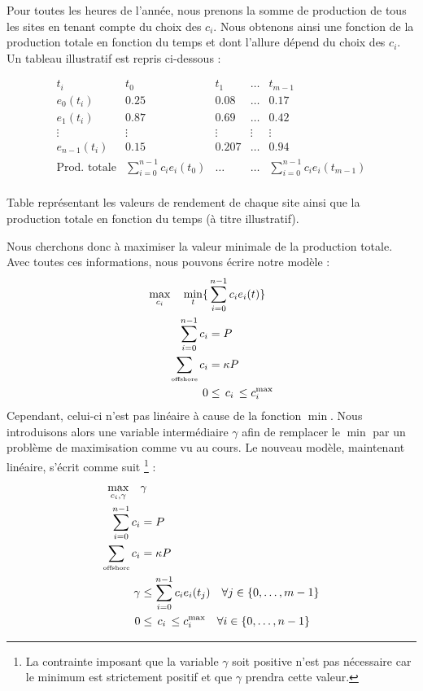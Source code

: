 \documentclass{article}
\newlength{\temp}
\begin{document}
Pour toutes les heures de l'année, nous prenons la somme de production de tous les sites en tenant compte du choix des $c_i$. Nous obtenons ainsi une fonction de la production totale en fonction du temps et dont l'allure dépend du choix des $c_i$.
Un tableau illustratif est repris ci-dessous :
\begin{table}[h!]
\centering
    \[ \begin{array}{c|cccc}
      t_i    & {t_0} & {t_1} & {\ldots}  & {t_{m-1}}\\
      \hline
      e_0(t_i) & 0.25       & 0.08   &\ldots    & 0.17 \\
      e_1(t_i) & 0.87       & 0.69   &\ldots    & 0.42 \\
      \vdots   & \vdots     & \vdots  &\vdots   & \vdots \\
      e_{n-1}(t_i) & 0.15       & 0.207   &\ldots    & 0.94 \\
      \hline
      \text{Prod. totale} &\scriptstyle \sum \limits_{i=0}^{n-1}c_i e_i(t_0) &\ldots &\ldots &\scriptstyle \sum \limits_{i=0}^{n-1}c_i e_i(t_{m-1})\\
    \end{array} \]
\caption{Table représentant les valeurs de rendement de chaque site ainsi que la production totale en fonction du temps (à titre illustratif).}
\label{table:table_rendement_illustratif}
\end{table}
\newpage
Nous cherchons donc à maximiser la valeur minimale de la production totale. Avec toutes ces informations, nous pouvons écrire notre modèle :
\begin{align*}
    \max_{c_i} \quad  
    \min_t \{ &\sum_{i=0}^{n-1}c_i e_i(t) \} \\ 
    \sum_{i=0}^{n-1} c_i &= P\\
    \sum_{\text{\tiny offshore}}c_i &= \kappa P\\
    0 &\le \, c_i \, \le c_i^{\max}\\
\end{align*}
Cependant, celui-ci n'est pas linéaire à cause de la fonction $\min$. Nous introduisons alors une variable intermédiaire $\gamma$ afin de remplacer le $\min$ par un problème de maximisation comme vu au cours. Le nouveau modèle, maintenant linéaire, s'écrit comme suit \footnote{La contrainte imposant que la variable $\gamma$ soit positive n'est pas nécessaire car le minimum est strictement positif et que $\gamma$ prendra cette valeur.} :
\begin{align}
    \max_{c_i, \gamma} \quad &\gamma \nonumber \\ 
    \sum_{i=0}^{n-1} c_i &= P\\
    \sum_{\text{\tiny offshore}}c_i &= \kappa P\\
    \gamma &\le \sum_{i=0}^{n-1} c_i e_i(t_j) \quad \forall j \in \{0, \ldots, m-1\}\\
    0 &\le \, c_i \, \le c_i^{\max} \quad \forall i \in \{0, \ldots, n-1\}
\end{align}
\end{document}
